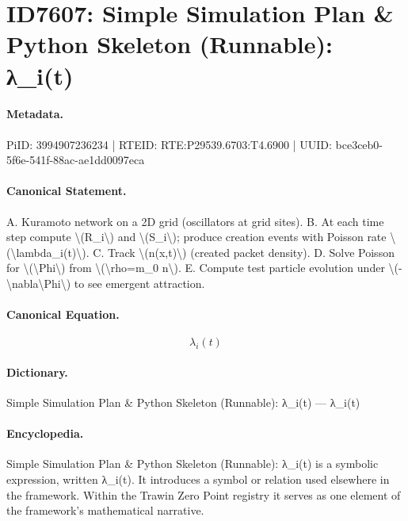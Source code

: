 \section*{ID7607: Simple Simulation Plan \& Python Skeleton (Runnable): λ\_i(t)}
\paragraph{Metadata.}
PiID: 3994907236234 | RTEID: RTE:P29539.6703:T4.6900 | UUID: bce3ceb0-5f6e-541f-88ac-ae1dd0097eca

\paragraph{Canonical Statement.}
A. Kuramoto network on a 2D grid (oscillators at grid sites). B. At each time step compute \textbackslash{}(R\_i\textbackslash{}) and \textbackslash{}(S\_i\textbackslash{}); produce creation events with Poisson rate \textbackslash{}(\textbackslash{}lambda\_i(t)\textbackslash{}). C. Track \textbackslash{}(n(x,t)\textbackslash{}) (created packet density). D. Solve Poisson for \textbackslash{}(\textbackslash{}Phi\textbackslash{}) from \textbackslash{}(\textbackslash{}rho=m\_0 n\textbackslash{}). E. Compute test particle evolution under \textbackslash{}(-\textbackslash{}nabla\textbackslash{}Phi\textbackslash{}) to see emergent attraction.

\paragraph{Canonical Equation.}
\[
\lambda_i(t)
\]

\paragraph{Dictionary.}
Simple Simulation Plan \& Python Skeleton (Runnable): λ\_i(t) — λ\_i(t)

\paragraph{Encyclopedia.}
Simple Simulation Plan \& Python Skeleton (Runnable): λ\_i(t) is a symbolic expression, written λ\_i(t). It introduces a symbol or relation used elsewhere in the framework. Within the Trawin Zero Point registry it serves as one element of the framework's mathematical narrative.
